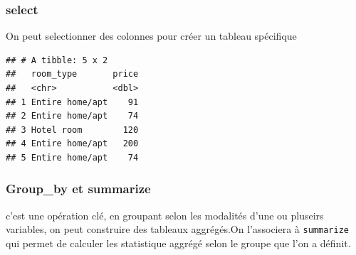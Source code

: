 \documentclass[
]{book}
\newenvironment{Shaded}{\begin{snugshade}}{\end{snugshade}}
\newcommand{\CommentTok}[1]{\textcolor[rgb]{0.56,0.35,0.01}{\textit{#1}}}
\newcommand{\DataTypeTok}[1]{\textcolor[rgb]{0.13,0.29,0.53}{#1}}
\newcommand{\DecValTok}[1]{\textcolor[rgb]{0.00,0.00,0.81}{#1}}
\newcommand{\KeywordTok}[1]{\textcolor[rgb]{0.13,0.29,0.53}{\textbf{#1}}}
\newcommand{\NormalTok}[1]{#1}
\newcommand{\OperatorTok}[1]{\textcolor[rgb]{0.81,0.36,0.00}{\textbf{#1}}}
\newcommand{\StringTok}[1]{\textcolor[rgb]{0.31,0.60,0.02}{#1}}
\begin{document}
\hypertarget{select}{%
\subsubsection{select}\label{select}}

On peut selectionner des colonnes pour créer un tableau spécifique

\begin{Shaded}
\end{Shaded}

\begin{verbatim}
## # A tibble: 5 x 2
##   room_type       price
##   <chr>           <dbl>
## 1 Entire home/apt    91
## 2 Entire home/apt    74
## 3 Hotel room        120
## 4 Entire home/apt   200
## 5 Entire home/apt    74
\end{verbatim}

\hypertarget{group_by-et-summarize}{%
\subsubsection{Group\_by et summarize}\label{group_by-et-summarize}}

c'est une opération clé, en groupant selon les modalités d'une ou pluseirs variables, on peut construire des tableaux aggrégés.On l'associera à \texttt{summarize} qui permet de calculer les statistique aggrégé selon le groupe que l'on a définit.

\begin{Shaded}
\end{Shaded}
\end{document}

